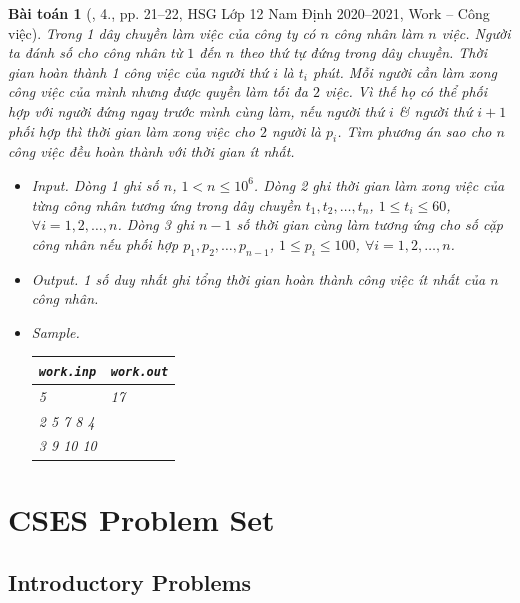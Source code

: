 \documentclass{article}
\newtheorem{baitoan}{Bài toán}
\begin{document}
\begin{baitoan}[\cite{Trung_HSG_THPT_Tin}, 4., pp. 21--22, HSG Lớp 12 Nam Định 2020--2021, Work -- Công việc]
	Trong 1 dây chuyền làm việc của công ty có $n$ công nhân làm $n$ việc. Người ta đánh số cho công nhân từ $1$ đến $n$ theo thứ tự đứng trong dây chuyền. Thời gian hoàn thành 1 công việc của người thứ $i$ là $t_i$ phút. Mỗi người cần làm xong công việc của mình nhưng được quyền làm tối đa $2$ việc. Vì thế họ có thể phối hợp với người đứng ngay trước mình cùng làm, nếu người thứ $i$ \& người thứ $i + 1$ phối hợp thì thời gian làm xong việc cho $2$ người là $p_i$. Tìm phương án sao cho $n$ công việc đều hoàn thành với thời gian ít nhất.
	\begin{itemize}
		\item {\sf Input.} Dòng 1 ghi số $n$, $1 < n\le10^6$. Dòng 2 ghi thời gian làm xong việc của từng công nhân tương ứng trong dây chuyền $t_1,t_2,\ldots,t_n$, $1\le t_i\le60$, $\forall i = 1,2,\ldots,n$. Dòng 3 ghi $n - 1$ số thời gian cùng làm tương ứng cho số cặp công nhân nếu phối hợp $p_1,p_2,\ldots,p_{n-1}$, $1\le p_i\le100$, $\forall i = 1,2,\ldots,n$.
		\item {\sf Output.} 1 số duy nhất ghi tổng thời gian hoàn thành công việc ít nhất của $n$ công nhân.
		\item {\sf Sample.}
		\begin{table}[H]
			\centering
			\begin{tabular}{|l|l|}
				\hline
				\verb|work.inp| & \verb|work.out| \\
				\hline
				5 & 17 \\
				2 5 7 8 4 & \\
				3 9 10 10 & \\
				\hline
			\end{tabular}
		\end{table}
	\end{itemize}
\end{baitoan}


\section{CSES Problem Set}

\subsection{Introductory Problems}
\end{document}
